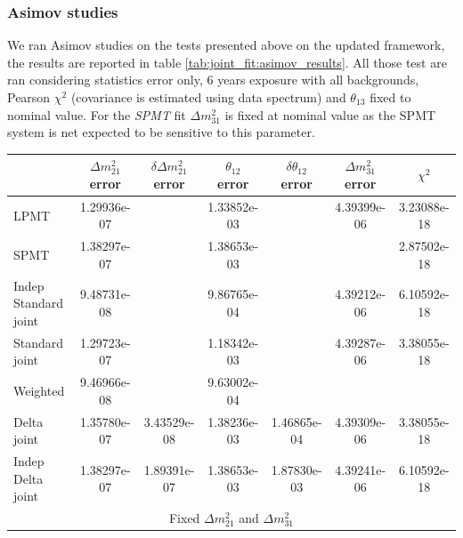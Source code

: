 \documentclass[../main.tex]{subfiles}
\begin{document}
\subsubsection{Asimov studies}

We ran Asimov studies on the tests presented above on the updated framework, the results are reported in table \ref{tab:joint_fit:asimov_results}. All those test are ran considering statistics error only, 6 years exposure with all backgrounds, Pearson $\chi^2$ (covariance is estimated using data spectrum) and $\theta_{13}$ fixed to nominal value. For the \textit{SPMT} fit $\Delta m^2_{31}$ is fixed at nominal value as the SPMT system is net expected to be sensitive to this parameter.

\begin{table}[ht]
  \begin{footnotesize}
  \centering
  \begin{tabular}{l | c | c | c | c | c | c }
                                    & $\Delta m^2_{21}$ error  & $\delta \Delta m^2_{21}$ error & $\theta_{12}$ error   & $\delta \theta_{12}$ error  & $\Delta m^2_{31}$ error & $\chi^2$ \\
                                    \hline
  LPMT                                 & 1.29936e-07   &               & 1.33852e-03   &               & 4.39399e-06   & 3.23088e-18 \\
  SPMT                                 & 1.38297e-07   &               & 1.38653e-03   &               &               & 2.87502e-18 \\
  Indep Standard joint                 & 9.48731e-08   &               & 9.86765e-04   &               & 4.39212e-06   & 6.10592e-18 \\
  Standard joint                       & 1.29723e-07   &               & 1.18342e-03   &               & 4.39287e-06   & 3.38055e-18 \\
  Weighted                             & 9.46966e-08   &               & 9.63002e-04   &               &               & \\
  \hline
  Delta joint                            & 1.35780e-07   & 3.43529e-08   & 1.38236e-03   & 1.46865e-04   & 4.39309e-06   & 3.38055e-18 \\
  Indep Delta joint                      & 1.38297e-07   & 1.89391e-07   & 1.38653e-03   & 1.87830e-03   & 4.39241e-06   & 6.10592e-18 \\
  \hline
  \hline
  \multicolumn{7}{c}{Fixed $\Delta m^2_{21}$ and $\Delta m^2_{31}$} \\

\end{tabular}
\end{footnotesize}
\end{table}
\end{document}
